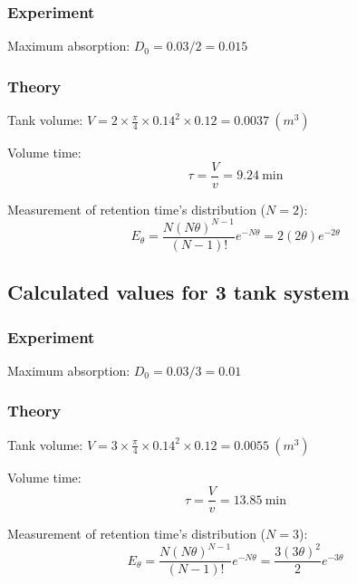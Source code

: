 \subsubsection{Experiment}
Maximum absorption: $D_0 = 0.03 / 2 = 0.015$

\subsubsection{Theory}
Tank volume: $V = 2 \times \frac{\pi}{4} \times 0.14^2 \times 0.12 = 0.0037~(m^3)$

Volume time:
\begin{equation}
    \tau = \frac{V}{v} = 9.24~\text{min}
\end{equation}

Measurement of retention time's distribution ($N=2$):
\begin{equation}
    E_{\theta} = \frac{N(N\theta)^{N-1}}{(N-1)!} e^{-N\theta} = 2(2\theta) e^{-2\theta}
\end{equation}

\subsection{Calculated values for 3 tank system}
\subsubsection{Experiment}
Maximum absorption: $D_0 = 0.03 / 3 = 0.01$

\subsubsection{Theory}
Tank volume: $V = 3 \times \frac{\pi}{4} \times 0.14^2 \times 0.12 = 0.0055~(m^3)$

Volume time:
\begin{equation}
    \tau = \frac{V}{v} = 13.85~\text{min}
\end{equation}

Measurement of retention time's distribution ($N=3$):
\begin{equation}
    E_{\theta} = \frac{N(N\theta)^{N-1}}{(N-1)!} e^{-N\theta} = \frac{3(3\theta)^2}{2} e^{-3\theta}
\end{equation}
